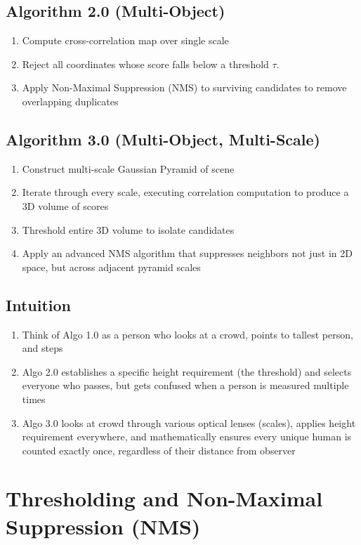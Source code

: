 \documentclass[12pt]{article}
\begin{document}
\subsection{Algorithm 2.0 (Multi-Object)}
\begin{enumerate}
    \item Compute cross-correlation map over single scale
    \item Reject all coordinates whose score falls below a threshold \(\tau\).
    \item Apply Non-Maximal Suppression (NMS) to surviving candidates to remove overlapping duplicates
\end{enumerate}

\subsection{Algorithm 3.0 (Multi-Object, Multi-Scale)}
\begin{enumerate}
    \item Construct multi-scale Gaussian Pyramid of scene
    \item Iterate through every scale, executing correlation computation to produce a 3D volume of scores
    \item Threshold entire 3D volume to isolate candidates
    \item Apply an advanced NMS algorithm that suppresses neighbors not just in 2D space, but across adjacent pyramid scales
\end{enumerate}

\subsection{Intuition}
\begin{enumerate}
    \item Think of Algo 1.0 as a person who looks at a crowd, points to tallest person, and steps
    \item Algo 2.0 establishes a specific height requirement (the threshold) and selects everyone who passes, but gets confused when a person is measured multiple times
    \item Algo 3.0 looks at crowd through various optical lenses (scales), applies height requirement everywhere, and mathematically ensures every unique human is counted exactly once, regardless of their distance from observer
\end{enumerate}


\section{Thresholding and Non-Maximal Suppression (NMS)}
\end{document}
